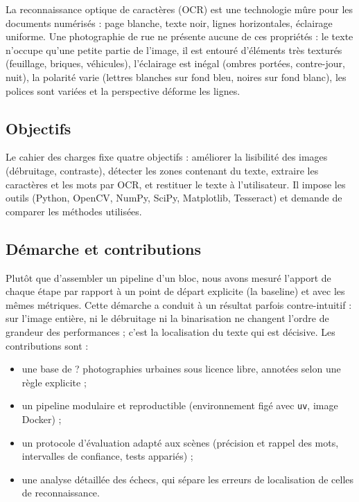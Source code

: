 \documentclass[11pt,a4paper]{article}
\newcommand{\nbImages}{?}\newcommand{\configFinale}{?}\newcommand{\baseFmed}{?}%
\begin{document}
La reconnaissance optique de caractères (OCR) est une technologie mûre pour les documents numérisés : page blanche, texte noir, lignes horizontales, éclairage uniforme. Une photographie de rue ne présente aucune de ces propriétés : le texte n'occupe qu'une petite partie de l'image, il est entouré d'éléments très texturés (feuillage, briques, véhicules), l'éclairage est inégal (ombres portées, contre-jour, nuit), la polarité varie (lettres blanches sur fond bleu, noires sur fond blanc), les polices sont variées et la perspective déforme les lignes.

\subsection{Objectifs}
Le cahier des charges fixe quatre objectifs : améliorer la lisibilité des images (débruitage, contraste), détecter les zones contenant du texte, extraire les caractères et les mots par OCR, et restituer le texte à l'utilisateur. Il impose les outils (Python, OpenCV, NumPy, SciPy, Matplotlib, Tesseract) et demande de comparer les méthodes utilisées.

\subsection{Démarche et contributions}
Plutôt que d'assembler un pipeline d'un bloc, nous avons mesuré l'apport de chaque étape par rapport à un point de départ explicite (la baseline) et avec les mêmes métriques. Cette démarche a conduit à un résultat parfois contre-intuitif : sur l'image entière, ni le débruitage ni la binarisation ne changent l'ordre de grandeur des performances ; c'est la localisation du texte qui est décisive. Les contributions sont :
\begin{itemize}
\item une base de \nbImages{} photographies urbaines sous licence libre, annotées selon une règle explicite ;
\item un pipeline modulaire et reproductible (environnement figé avec \texttt{uv}, image Docker) ;
\item un protocole d'évaluation adapté aux scènes (précision et rappel des mots, intervalles de confiance, tests appariés) ;
\item une analyse détaillée des échecs, qui sépare les erreurs de localisation de celles de reconnaissance.
\end{itemize}

\end{document}
